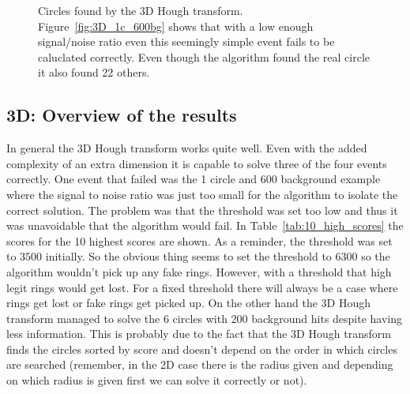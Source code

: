 \documentclass[11pt,twoside]{scrreprt}
\begin{document}
\begin{figure}[htp]
        \centering

        \caption[Circles found by the 3D Hough transform]{Circles found by the 3D Hough transform. Figure~\ref{fig:3D_1c_600bg} shows that with a low enough signal/noise ratio even this seemingly simple event fails to be caluclated correctly. Even though the algorithm found the real circle it also found 22 others.\label{fig:3D_HT_results}}
\end{figure}


\subsection{3D: Overview of the results} %
\label{ssub:3d_overview_of_the_results}

In general the 3D Hough transform works quite well. Even with the added complexity of an extra dimension it is capable to solve three of
the four events correctly. One event that failed was the 1 circle and 600 background example where the signal to noise ratio was just 
too small for the algorithm to isolate the correct solution. The problem was that the threshold was set too low and thus it was unavoidable
that the algorithm would fail. In Table~\ref{tab:10_high_scores} the scores for the 10 highest scores are shown. As a reminder, the threshold
was set to $3500$ initially. So the obvious thing seems to set the threshold to $6300$ so the algorithm wouldn't pick up any fake rings.
However, with a threshold that high legit rings would get lost. For a fixed threshold there will always be a case where rings get
lost or fake rings get picked up. 
On the other hand the 3D Hough transform managed to solve the 6 circles with 200 background hits despite having less information. 
This is probably due to the fact that the 3D Hough transform finds the circles sorted by score and doesn't depend on the order in 
which circles are searched (remember, in the 2D case there is the radius given and depending on which radius is given first we can 
solve it correctly or not).
\end{document}
